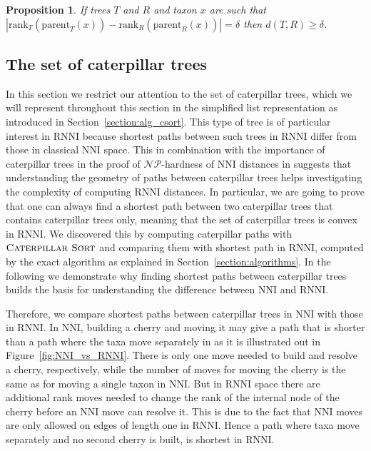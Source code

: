 \documentclass{amsart}
\newcommand{\np}{\mathcal{NP}}
\newcommand{\parent}{\mathrm{parent}}
\newcommand{\rank}{\mathrm{rank}}
\newcommand{\nni}{\mathrm{NNI}}
\newcommand{\rnni}{\mathrm{RNNI}}
\newcommand{\csort}{\textsc{Caterpillar Sort}}
\newtheorem{proposition}[definition]{Proposition}
\begin{document}
\begin{proposition}
If trees $T$ and $R$ and taxon $x$ are such that $|\rank_T(\parent_T(x)) - \rank_R(\parent_R(x))| = \delta$ then $d(T,R) \geq \delta$.
\label{proposition:lower_bound_distance}
\end{proposition}


\subsection{The set of caterpillar trees}
\label{section:caterpillar_convex}

In this section we restrict our attention to the set of caterpillar trees, which we will represent throughout this section in the simplified list representation as introduced in Section~\ref{section:alg_csort}.
This type of tree is of particular interest in $\rnni$ because shortest paths between such trees in $\rnni$ differ from those in classical $\nni$ space.
This in combination with the importance of caterpillar trees in the proof of $\np$-hardness of $\nni$ distances in \autocite{Dasgupta2000-xa} suggests that understanding the geometry of paths between caterpillar trees helps investigating the complexity of computing $\rnni$ distances.
In particular, we are going to prove that one can always find a shortest path between two caterpillar trees that contains caterpillar trees only, meaning that the set of caterpillar trees is convex in $\rnni$.
We discovered this by computing caterpillar paths with $\csort$ and comparing them with shortest path in $\rnni$, computed by the exact algorithm as explained in Section~\ref{section:algorithms}.
In the following we demonstrate why finding shortest paths between caterpillar trees builds the basis for understanding the difference between $\nni$ and $\rnni$.

Therefore, we compare shortest paths between caterpillar trees in $\nni$ with those in $\rnni$.
In $\nni$, building a cherry and moving it may give a path that is shorter than a path where the taxa move separately in as it is illustrated out in Figure~\ref{fig:NNI_vs_RNNI}.
There is only one move needed to build and resolve a cherry, respectively, while the number of moves for moving the cherry is the same as for moving a single taxon in $\nni$.
But in $\rnni$ space there are additional rank moves needed to change the rank of the internal node of the cherry before an $\nni$ move can resolve it.
This is due to the fact that $\nni$ moves are only allowed on edges of length one in $\rnni$.
Hence a path where taxa move separately and no second cherry is built, is shortest in $\rnni$.
\end{document}
